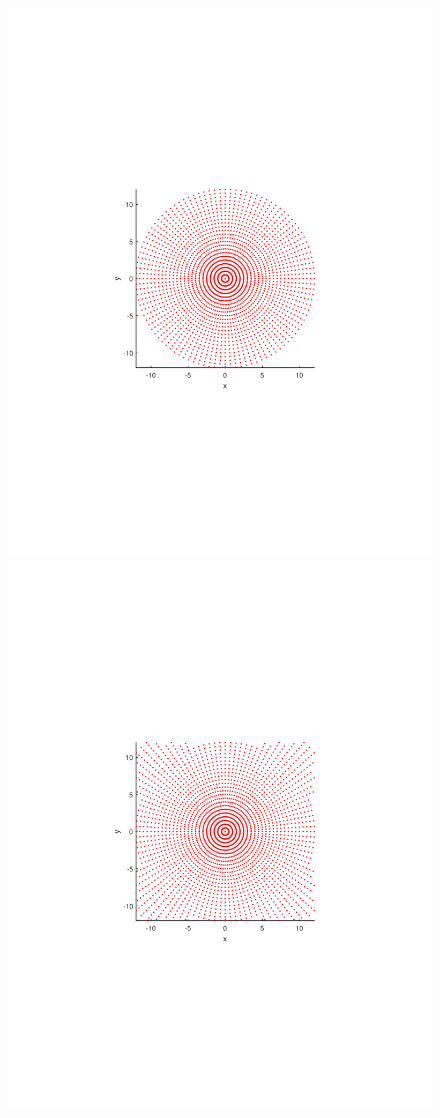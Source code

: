 \documentclass{UCF_ETD}
\begin{document}
\begin{figure}[H]
\begin{center}
 \includegraphics[scale=0.5]{PolarSphericalDFT/PurePolarGridx2}
 \includegraphics[scale=0.5]{PolarSphericalDFT/PolarWithRadialCornerx2}

\end{center}
\end{figure}
\end{document}
